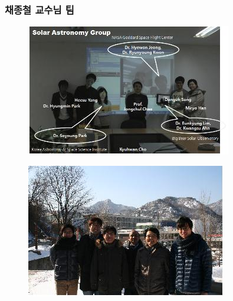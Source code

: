 \subsubsection{채종철 교수님 팀}
\begin{figure}
\centering
\begin{minipage}{0.50\textwidth}
  \centering
\includegraphics[width=\textwidth]{./Figures/team-chae-1.jpg}
 \label{fig:mult2}
\end{minipage}
\hfill
\begin{minipage}{0.48\textwidth}
  \centering
 \includegraphics[width=\textwidth]{./Figures/team-chae-2.jpg}
 \label{fig:mult3}
\end{minipage}
\end{figure}

